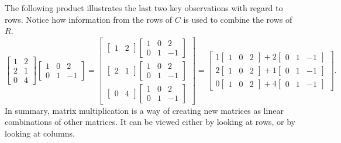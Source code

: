 \documentclass[10pt]{article}
\begin{document}
The following product illustrates the last two key observations with regard to rows. Notice how information from the rows of $C$ is used to combine the rows of $R$.
$$
\begin {bmatrix} 1&2\\2&1\\0&4 \end {bmatrix}\begin {bmatrix} 1&0&2\\0&1&-1 \end {bmatrix} 
=
\begin{bmatrix}
\begin{bmatrix}1&2\end {bmatrix} \begin {bmatrix} 1&0&2\\0&1&-1 \end {bmatrix}\\
\begin{bmatrix}2&1 \end {bmatrix} \begin {bmatrix} 1&0&2\\0&1&-1 \end {bmatrix}\\
\begin{bmatrix}0&4 \end {bmatrix} \begin {bmatrix} 1&0&2\\0&1&-1 \end {bmatrix}
\end{bmatrix}
=
\begin{bmatrix}
1 \begin {bmatrix} 1&0&2 \end {bmatrix} +2 \begin {bmatrix} 0&1&-1 \end {bmatrix}\\
2 \begin {bmatrix} 1&0&2 \end {bmatrix} +1 \begin {bmatrix} 0&1&-1 \end {bmatrix}\\
0 \begin {bmatrix} 1&0&2 \end {bmatrix} +4 \begin {bmatrix} 0&1&-1 \end {bmatrix}
\end{bmatrix}.
$$
In summary, matrix multiplication is a way of creating new matrices as linear combinations of other matrices. It can be viewed either by looking at rows, or by looking at columns.
\end{document}
